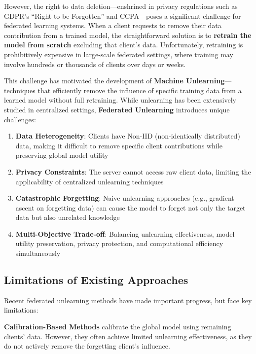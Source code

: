 \documentclass[10pt,twocolumn]{article}
\begin{document}
However, the right to data deletion---enshrined in privacy regulations such as GDPR's ``Right to be Forgotten'' and CCPA---poses a significant challenge for federated learning systems. When a client requests to remove their data contribution from a trained model, the straightforward solution is to \textbf{retrain the model from scratch} excluding that client's data. Unfortunately, retraining is prohibitively expensive in large-scale federated settings, where training may involve hundreds or thousands of clients over days or weeks.

This challenge has motivated the development of \textbf{Machine Unlearning}---techniques that efficiently remove the influence of specific training data from a learned model without full retraining. While unlearning has been extensively studied in centralized settings, \textbf{Federated Unlearning} introduces unique challenges:

\begin{enumerate}
\item \textbf{Data Heterogeneity}: Clients have Non-IID (non-identically distributed) data, making it difficult to remove specific client contributions while preserving global model utility
\item \textbf{Privacy Constraints}: The server cannot access raw client data, limiting the applicability of centralized unlearning techniques
\item \textbf{Catastrophic Forgetting}: Naive unlearning approaches (e.g., gradient ascent on forgetting data) can cause the model to forget not only the target data but also unrelated knowledge
\item \textbf{Multi-Objective Trade-off}: Balancing unlearning effectiveness, model utility preservation, privacy protection, and computational efficiency simultaneously
\end{enumerate}

\subsection{Limitations of Existing Approaches}

Recent federated unlearning methods have made important progress, but face key limitations:

\textbf{Calibration-Based Methods} calibrate the global model using remaining clients' data. However, they often achieve limited unlearning effectiveness, as they do not actively remove the forgetting client's influence.
\end{document}
